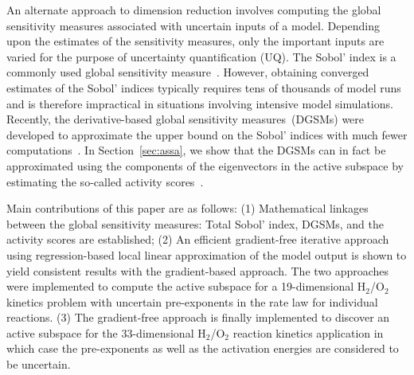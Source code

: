 An alternate approach to dimension reduction involves computing the global sensitivity
measures associated with uncertain inputs of a model. Depending upon the estimates of
the sensitivity measures, only the important inputs are varied for the purpose of
uncertainty quantification (UQ). The
Sobol' index is a commonly used global sensitivity measure~\cite{Sobol:2001}. However, obtaining
converged estimates of the Sobol' indices typically requires tens of thousands of model
runs and is therefore impractical in situations involving intensive model simulations.
Recently, the derivative-based global sensitivity measures~(DGSMs) were 
developed to approximate the upper bound on the Sobol' indices with much fewer
computations~\cite{Sobol:2009, Lamboni:2013}. In Section~\ref{sec:assa}, we show
that the DGSMs can in fact be approximated using the components of the eigenvectors
in the active subspace by estimating the so-called activity 
scores~\cite{Diaz:2016,Constantine:2017}.

Main contributions of this paper are as follows: (1) Mathematical linkages between the
global sensitivity measures: Total Sobol' index, DGSMs, and the activity scores are
established; (2) An efficient gradient-free iterative approach using regression-based local linear
approximation of the model output is shown to yield consistent results with the
gradient-based approach. The two approaches were implemented to compute
the active subspace for a 19-dimensional H$_2$/O$_2$ kinetics problem with 
uncertain pre-exponents in the rate law for individual reactions. (3) The gradient-free
approach is finally implemented to discover an active subspace for the 33-dimensional
H$_2$/O$_2$ reaction kinetics application in which case the pre-exponents as well
as the activation energies are considered to be uncertain. 
 
